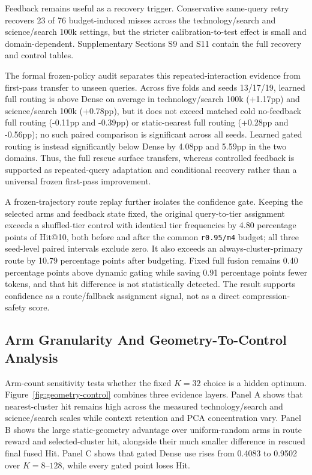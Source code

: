 Feedback remains useful as a recovery trigger. Conservative same-query retry recovers 23 of 76 budget-induced misses across the technology/search and science/search 100k settings, but the stricter calibration-to-test effect is small and domain-dependent. Supplementary Sections S9 and S11 contain the full recovery and control tables.

The formal frozen-policy audit separates this repeated-interaction evidence from first-pass transfer to unseen queries. Across five folds and seeds 13/17/19, learned full routing is above Dense on average in technology/search 100k (+1.17pp) and science/search 100k (+0.78pp), but it does not exceed matched cold no-feedback full routing (-0.11pp and -0.39pp) or static-nearest full routing (+0.28pp and -0.56pp); no such paired comparison is significant across all seeds. Learned gated routing is instead significantly below Dense by 4.08pp and 5.59pp in the two domains. Thus, the full rescue surface transfers, whereas controlled feedback is supported as repeated-query adaptation and conditional recovery rather than a universal frozen first-pass improvement.

A frozen-trajectory route replay further isolates the confidence gate. Keeping the selected arms and feedback state fixed, the original query-to-tier assignment exceeds a shuffled-tier control with identical tier frequencies by 4.80 percentage points of Hit@10, both before and after the common \nolinkurl{r0.95/m4} budget; all three seed-level paired intervals exclude zero. It also exceeds an always-cluster-primary route by 10.79 percentage points after budgeting. Fixed full fusion remains 0.40 percentage points above dynamic gating while saving 0.91 percentage points fewer tokens, and that hit difference is not statistically detected. The result supports confidence as a route/fallback assignment signal, not as a direct compression-safety score.

\subsection{Arm Granularity And Geometry-To-Control Analysis}
\label{sec:06-results:arm-granularity-and-geometry-to-control-analysis}

Arm-count sensitivity tests whether the fixed $K=32$ choice is a hidden optimum. Figure~\ref{fig:geometry-control} combines three evidence layers. Panel A shows that nearest-cluster hit remains high across the measured technology/search and science/search scales while context retention and PCA concentration vary. Panel B shows the large static-geometry advantage over uniform-random arms in route reward and selected-cluster hit, alongside their much smaller difference in rescued final fused Hit. Panel C shows that gated Dense use rises from 0.4083 to 0.9502 over $K=8$--$128$, while every gated point loses Hit.

